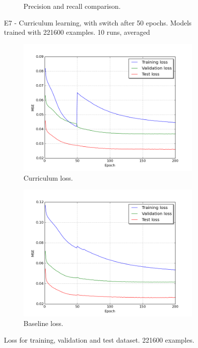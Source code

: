 \begin{figure}
\begin{subfigure}{0.48\textwidth}
\caption{Precision and recall comparison.} \label{fig:curr100_pr}
\end{subfigure}
\hspace*{\fill} %
\caption{E7 - Curriculum learning, with switch after 50 epochs. Models trained with 221600 examples. 10 runs, averaged} \label{fig:curr100}
\end{figure}


\begin{figure}
\begin{subfigure}{0.48\textwidth}
\includegraphics[width=\linewidth]{figs/curr100/curriculum_loss_curves.png}
\caption{Curriculum loss.} \label{fig:curr100_loss2}
\end{subfigure}
\hspace*{\fill} %
\begin{subfigure}{0.48\textwidth}
\includegraphics[width=\linewidth]{figs/curr100/baseline_loss_curves.png}
\caption{Baseline loss.} \label{fig:curr100_epochs_baseline2}
\end{subfigure}
\hspace*{\fill} %
\caption{Loss for training, validation and test dataset. 221600 examples.} \label{fig:curr100_loss_epochs}
\end{figure}

